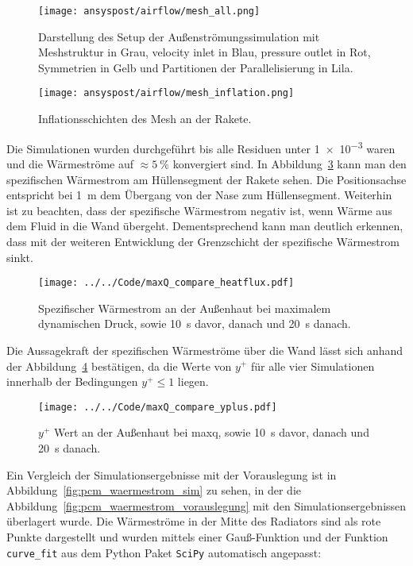 \begin{figure}
  \centering
  \texttt{[image: ansyspost/airflow/mesh\_all.png]}
  \caption{Darstellung des Setup der Außenströmungssimulation mit Meshstruktur in Grau, velocity inlet in Blau, pressure outlet in Rot, Symmetrien in Gelb und Partitionen der Parallelisierung in Lila.}\label{fig:aussenstroemung_mesh}
\end{figure}

\begin{figure}
  \centering
  \texttt{[image: ansyspost/airflow/mesh\_inflation.png]}
  \caption{Inflationsschichten des Mesh an der Rakete.}\label{fig:aussenstroemung_mesh_inflationlayers}
\end{figure}

Die Simulationen wurden durchgeführt bis alle Residuen unter \SI{1e-3}{} waren und die Wärmeströme auf $\approx\SI{5}{\percent}$ konvergiert sind.
In Abbildung~\ref{fig:spezifischer_waermestrom_maxQ_simulationen} kann man den spezifischen Wärmestrom am Hüllensegment der Rakete sehen.
Die Positionsachse entspricht bei \SI{1}{\meter} dem Übergang von der Nase zum Hüllensegment. Weiterhin ist zu beachten, dass der spezifische Wärmestrom
negativ ist, wenn Wärme aus dem Fluid in die Wand übergeht. Dementsprechend kann man deutlich erkennen, dass mit der weiteren Entwicklung der Grenzschicht
der spezifische Wärmestrom sinkt.

\begin{figure}
  \centering
  \texttt{[image: ../../Code/maxQ\_compare\_heatflux.pdf]}
  \caption{Spezifischer Wärmestrom an der Außenhaut bei maximalem dynamischen Druck, sowie \SI{10}{s} davor, danach und \SI{20}{s} danach.}\label{fig:spezifischer_waermestrom_maxQ_simulationen}
\end{figure}

Die Aussagekraft der spezifischen Wärmeströme über die Wand lässt sich anhand der Abbildung~\ref{fig:yplus_maxQ_simulationen} bestätigen, da die Werte von $y^+$
für alle vier Simulationen innerhalb der Bedingungen $y^+ \leq 1$ liegen.

\begin{figure}
  \centering
  \texttt{[image: ../../Code/maxQ\_compare\_yplus.pdf]}
  \caption{$y^+$ Wert an der Außenhaut bei \acs{maxq}, sowie \SI{10}{s} davor, danach und \SI{20}{s} danach.}\label{fig:yplus_maxQ_simulationen}
\end{figure}

Ein Vergleich der Simulationsergebnisse mit der Vorauslegung ist in Abbildung~\ref{fig:pcm_waermestrom_sim} zu sehen, in der die Abbildung~\ref{fig:pcm_waermestrom_vorauslegung} mit den
Simulationsergebnissen überlagert wurde. Die Wärmeströme in der Mitte des Radiators sind als rote Punkte dargestellt und wurden mittels einer Gauß-Funktion und der Funktion \texttt{curve\_fit} aus dem
Python Paket \texttt{SciPy} automatisch angepasst:

